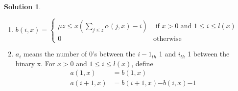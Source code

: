 \documentclass[12pt,a4paper]{article}
\theoremstyle{definition}
\newtheorem*{solution}{Solution}
\numberwithin{equation}{section}
\numberwithin{figure}{section}
\begin{document}
\begin{enumerate}
\begin{solution}
\begin{enumerate}
        \item $b(i,x)=\left\{\begin{array}{ll}
        \mu z \leq x(\sum_{j \leq z} \alpha(j,x) - i)& \mbox{ if } x > 0 \mbox{ and }  1 \leq i \leq l(x)\\
        0& \mbox{otherwise}
        \end{array}\right.$
        
        \item $a_i$ means the number of 0's between the ${i-1}_{th}$ 1 and $i_{th}$ 1 between the binary x. For $x>0$ and $1\leq i \leq l(x)$, define
            \begin{align*}
            a(1,x) &= b(1,x)\\
            a(i+1,x) & = b(i+1,x)\dot - b(i,x) \dot - 1
            \end{align*}
    
    \end{enumerate}
    
    \end{solution}
\end{enumerate}


\end{document}
